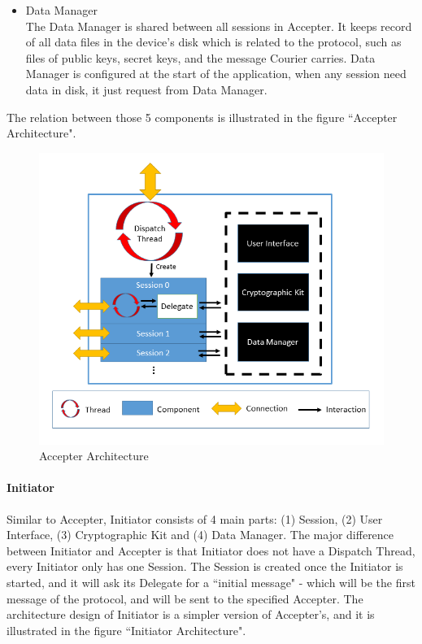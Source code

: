 \begin{itemize}
\item Data Manager \\
The Data Manager is shared between all sessions in Accepter. It keeps record of all data files in the device's disk which is related to the protocol, such as files of public keys, secret keys, and the message Courier carries. Data Manager is configured at the start of the application, when any session need data in disk, it just request from Data Manager.
\end{itemize}
The relation between those 5 components is illustrated in the figure ``Accepter Architecture".

\begin{figure}[h!]
\centering
\includegraphics[width=\textwidth,natwidth=696,natheight=589]{figures/accepterarchitecture.png}
\caption{Accepter Architecture}
\end{figure}

\paragraph{Initiator}
Similar to Accepter, Initiator consists of 4 main parts: (1) Session, (2) User Interface, (3) Cryptographic Kit and (4) Data Manager. The major difference between Initiator and Accepter is that Initiator does not have a Dispatch Thread, every Initiator only has one Session. The Session is created once the Initiator is started, and it will ask its Delegate for a ``initial message" - which will be the first message of the protocol, and will be sent to the specified Accepter. The architecture design of Initiator is a simpler version of Accepter's, and it is illustrated in the figure ``Initiator Architecture".

